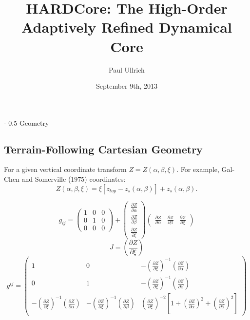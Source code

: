 \documentclass{article}
\title{\Huge \textbf{HARDCore: The High-Order Adaptively Refined Dynamical Core}}
\author{\Large Paul Ullrich}
\date{September 9th, 2013}
\makeatletter
\renewcommand\section{\@startsection
  {section}{2}{0mm}%
  {-\baselineskip}%
  {0.5\baselineskip}%
  {\normalfont\Huge\bfseries}}%
\newcommand{\pdiff}[2]{\frac{\partial #1}{\partial #2}}
\makeatother
\begin{document}
\section{Geometry}

\subsection{Terrain-Following Cartesian Geometry}

For a given vertical coordinate transform $Z = Z(\alpha, \beta, \xi)$.  For example, Gal-Chen and Somerville (1975) coordinates:
\begin{equation}
Z(\alpha, \beta, \xi) = \xi \left[ z_{top} - z_s(\alpha, \beta) \right] + z_s(\alpha, \beta).
\end{equation}

\begin{equation}
g_{ij} = \left( \begin{array}{ccc} 1 & 0 & 0 \\[2.0ex] 0 & 1 & 0 \\[2.0ex] 0 & 0 & 0 \end{array} \right) + \left( \begin{array}{c} \pdiff{Z}{\alpha} \\[2.0ex] \pdiff{Z}{\beta} \\[2.0ex] \pdiff{Z}{\xi} \end{array} \right) \left( \begin{array}{ccc} \pdiff{Z}{\alpha} & \pdiff{Z}{\beta} & \pdiff{Z}{\xi} \end{array} \right)
\end{equation}
\begin{equation}
J = \left( \pdiff{Z}{\xi} \right)
\end{equation}
\begin{equation}
g^{ij} = \left( \begin{array}{ccc} 1 & 0 & - \left( \pdiff{Z}{\xi} \right)^{-1} \left( \pdiff{Z}{\alpha} \right) \\[2.0ex] 0 & 1 & - \left( \pdiff{Z}{\xi} \right)^{-1} \left( \pdiff{Z}{\beta} \right) \\[2.0ex] - \left( \pdiff{Z}{\xi} \right)^{-1} \left( \pdiff{Z}{\alpha} \right) & - \left( \pdiff{Z}{\xi} \right)^{-1} \left( \pdiff{Z}{\beta} \right) & \left( \pdiff{Z}{\xi} \right)^{-2} \left[ 1 + \left( \pdiff{Z}{\alpha} \right)^2 + \left( \pdiff{Z}{\beta} \right)^2 \right] \end{array} \right)
\end{equation}
\end{document}
